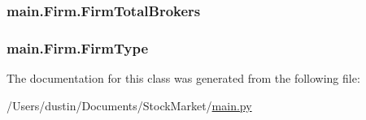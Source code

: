 \subsubsection[{Firm\+Total\+Brokers}]{\setlength{\rightskip}{0pt plus 5cm}main.\+Firm.\+Firm\+Total\+Brokers}\label{classmain_1_1_firm_a7a9582954ab4ae90b498a38e0cdec73e}
\hypertarget{classmain_1_1_firm_ab005092f1323f6b4426560dadd475e9e}{}
\subsubsection[{Firm\+Type}]{\setlength{\rightskip}{0pt plus 5cm}main.\+Firm.\+Firm\+Type}\label{classmain_1_1_firm_ab005092f1323f6b4426560dadd475e9e}


The documentation for this class was generated from the following file\+:\begin{DoxyCompactItemize}
\item 
/\+Users/dustin/\+Documents/\+Stock\+Market/\hyperlink{main_8py}{main.\+py}\end{DoxyCompactItemize}
